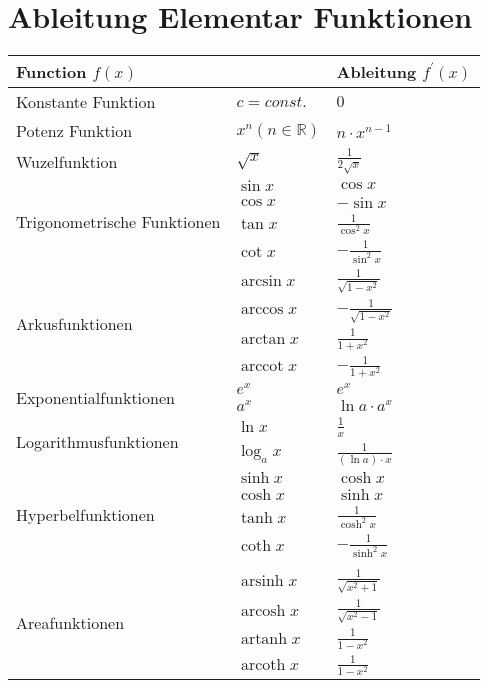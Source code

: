 \documentclass[11pt]{article}
\DeclareMathOperator{\arccot}{arccot}
\DeclareMathOperator{\arcoth}{arcoth}
\DeclareMathOperator{\arsinh}{arsinh}
\DeclareMathOperator{\artanh}{artanh}
\DeclareMathOperator{\arcosh}{arcosh}
\begin{document}
\section{Ableitung Elementar Funktionen}
\begin{center}
\renewcommand{\arraystretch}{2}
\begin{longtable}[l] {|m{4cm}|m{5cm}|m{5cm}|}
 \hline
\multicolumn{2}{|l|}{Function $f(x)$} & Ableitung $f^\prime(x)$ \\
\hline
Konstante Funktion & $c=const.$ & $0$ \\
\hline
Potenz Funktion & $x^{n} (n \in \mathbb{R})$ & $n\cdot x^{n-1}$ \\
\hline
Wuzelfunktion & $\sqrt{x}$ & $\frac{1}{2\sqrt{x}}$ \\
\hline
\multirow{4}{4cm}{Trigonometrische Funktionen} & $\sin{x}$ & $\cos{x}$ \\
& $\cos{x}$ & $-\sin{x}$ \\
& $\tan{x}$ & $\frac{1}{\cos^2{x}}$ \\
& $\cot{x}$ & $-\frac{1}{\sin^2{x}}$ \\
\hline
\multirow{4}{4cm}{Arkusfunktionen} & $\arcsin{x}$ & $\frac{1}{\sqrt{1-x^2}}$ \\
& $\arccos{x}$ & $-\frac{1}{\sqrt{1-x^2}}$ \\
& $\arctan{x}$ & $\frac{1}{1+x^2}$ \\
& $\arccot{x}$ & $-\frac{1}{1+x^2}$ \\
\hline
\multirow{2}{4cm}{Exponentialfunktionen} & $e^{x}$ & $e^x$ \\
& $a^{x}$ & $\ln{a}\cdot a^x$ \\
\hline
\multirow{2}{4cm}{Logarithmusfunktionen} & $\ln{x}$ & $\frac{1}{x}$ \\
& $\log_a{x}$ & $\frac{1}{(\ln{a})\cdot x}$ \\
\hline
\multirow{4}{4cm}{Hyperbelfunktionen} & $\sinh{x}$ & $\cosh{x}$ \\
& $\cosh{x}$ & $\sinh{x}$ \\
& $\tanh{x}$ & $\frac{1}{\cosh^2{x}}$ \\
& $\coth{x}$ & $-\frac{1}{\sinh^2{x}}$ \\
\\
\hline
\multirow{4}{4cm}{Areafunktionen} & $\arsinh{x}$ & $\frac{1}{\sqrt{x^2+1}}$ \\
& $\arcosh{x}$ & $\frac{1}{\sqrt{x^2-1}}$ \\
& $\artanh{x}$ & $\frac{1}{1 - x^2}$ \\
& $\arcoth{x}$ & $\frac{1}{1-x^2}$ \\
\hline
\end{longtable}
\end{center}
\end{document}
